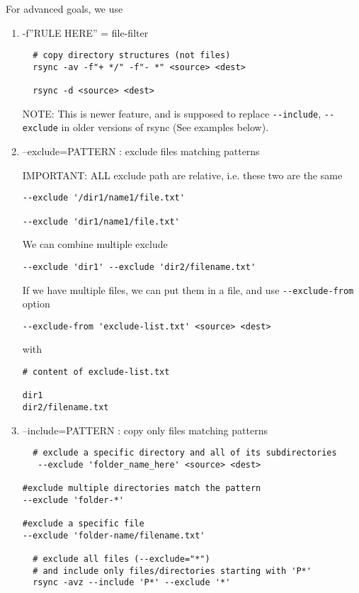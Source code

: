 For advanced goals, we use
\begin{enumerate}
  \item -f''RULE HERE'' = file-filter
  \begin{verbatim}
  # copy directory structures (not files)
  rsync -av -f"+ */" -f"- *" <source> <dest>
  
  rsync -d <source> <dest>
  \end{verbatim}
  NOTE: This is newer feature, and is supposed to replace \verb!--include!,
  \verb!--exclude! in older versions of rsync (See examples below).
  
  \item --exclude=PATTERN : exclude files matching patterns

IMPORTANT: ALL exclude path are relative, i.e. these two are the same
\begin{verbatim}
--exclude '/dir1/name1/file.txt'

--exclude 'dir1/name1/file.txt'
\end{verbatim}

We can combine multiple exclude
\begin{verbatim}
--exclude 'dir1' --exclude 'dir2/filename.txt'
\end{verbatim}
If we have multiple files, we can put them in a file, and use
\verb!--exclude-from! option
\begin{verbatim}
--exclude-from 'exclude-list.txt' <source> <dest>
\end{verbatim}
with
\begin{verbatim}
# content of exclude-list.txt

dir1
dir2/filename.txt
\end{verbatim}
  
  \item --include=PATTERN : copy only files matching patterns  

{\tiny
  \begin{verbatim}
  # exclude a specific directory and all of its subdirectories
   --exclude 'folder_name_here' <source> <dest>
   
#exclude multiple directories match the pattern
--exclude 'folder-*'

#exclude a specific file
--exclude 'folder-name/filename.txt'
  
  # exclude all files (--exclude="*")
  # and include only files/directories starting with 'P*'
  rsync -avz --include 'P*' --exclude '*'
  \end{verbatim}
}
\end{enumerate}


